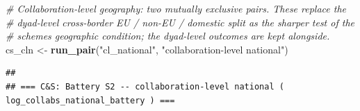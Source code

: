 \documentclass[
]{article}
\newenvironment{Shaded}{\begin{snugshade}}{\end{snugshade}}
\newcommand{\CommentTok}[1]{\textcolor[rgb]{0.56,0.35,0.01}{\textit{#1}}}
\newcommand{\FunctionTok}[1]{\textcolor[rgb]{0.13,0.29,0.53}{\textbf{#1}}}
\newcommand{\NormalTok}[1]{#1}
\newcommand{\OtherTok}[1]{\textcolor[rgb]{0.56,0.35,0.01}{#1}}
\newcommand{\StringTok}[1]{\textcolor[rgb]{0.31,0.60,0.02}{#1}}
\begin{document}
\begin{Shaded}
\begin{Highlighting}[]
\CommentTok{\# Collaboration{-}level geography: two mutually exclusive pairs. These replace the}
\CommentTok{\# dyad{-}level cross{-}border EU / non{-}EU / domestic split as the sharper test of the}
\CommentTok{\# scheme\textquotesingle{}s geographic condition; the dyad{-}level outcomes are kept alongside.}
\NormalTok{cs\_cln  }\OtherTok{\textless{}{-}} \FunctionTok{run\_pair}\NormalTok{(}\StringTok{"cl\_national"}\NormalTok{,      }\StringTok{"collaboration{-}level national"}\NormalTok{)}
\end{Highlighting}
\end{Shaded}

\begin{verbatim}
## 
## === C&S: Battery S2 -- collaboration-level national ( log_collabs_national_battery ) ===
\end{verbatim}
\end{document}
